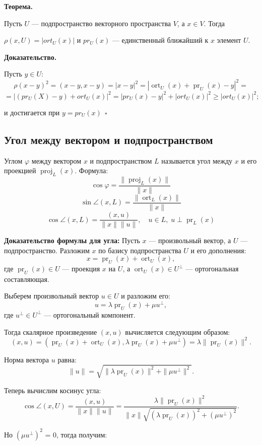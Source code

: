\documentclass[12pt]{article}
\begin{document}
\textbf{Теорема.}

Пусть \( U \) — подпространство векторного пространства \( V \), а \( x \in V \). Тогда

$\rho (x, U) = |ort_U(x)|$ и $pr_U(x)$ — единственный ближайший к $x$ элемент $U$.

\textbf{Доказательство.}

Пусть $y \in U$:
\[
\rho (x - y)^2 = (x - y, x-y) = |x-y|^2 = |\operatorname{ort}_U(x) + \operatorname{pr}_U(x) - y|^2 = 
\]
\[
= |(pr_U(X) - y) + ort_U(x)|^2 = |pr_U(x) - y|^2 + |ort_U(x)|^2 \geq |ort_U(x)|^2; 
\]

и достигается при $y = pr_U(x) \ \ \square$

\subsection{Угол между вектором и подпространством}
Углом $\varphi$ между вектором $x$ и подпространством $L$ называется угол между $x$ и его проекцией $\operatorname{proj}_L(x)$. Формула:
\[
\cos \varphi = \frac{\|\operatorname{proj}_L(x)\|}{\|x\|}
\]
\[
\sin \angle(x, L) = \frac{\|\operatorname{ort}_L(x)\|}{\|x\|}
\]
\[
\cos \angle(x, L) = \frac{(x, u)}{\|x\| \|u\|}, \quad u \in L, \; u \perp \operatorname{pr}_L(x)
\]

\textbf{Доказательство формулы для угла:}
Пусть $x$ — произвольный вектор, а $U$ — подпространство. Разложим $x$ по базису подпространства $U$ и его дополнения:
\[
x = \operatorname{pr}_U(x) + \operatorname{ort}_U(x),
\]
где $\operatorname{pr}_U(x) \in U$ — проекция $x$ на $U$, а $\operatorname{ort}_U(x) \in U^\perp$ — ортогональная составляющая.

Выберем произвольный вектор $u \in U$ и разложим его:
\[
u = \lambda \operatorname{pr}_U(x) + \mu u^\perp,
\]
где $u^\perp \in U^\perp$ — ортогональный компонент.

Тогда скалярное произведение $(x, u)$ вычисляется следующим образом:
\[
(x, u) = (\operatorname{pr}_U(x) + \operatorname{ort}_U(x), \lambda \operatorname{pr}_U(x) + \mu u^\perp) = \lambda \|\operatorname{pr}_U(x)\|^2.
\]

Норма вектора $u$ равна:
\[
\|u\| = \sqrt{\|\lambda \operatorname{pr}_U(x)\|^2 + \|\mu u^\perp\|^2}.
\]

Теперь вычислим косинус угла:
\[
\cos \angle(x, U) = \frac{(x, u)}{\|x\| \|u\|} = \frac{\lambda \|\operatorname{pr}_U(x)\|^2}{\|x\| \sqrt{(\lambda \operatorname{pr}_U(x))^2 + (\mu u^\perp)^2}}.
\]

Но $(\mu u^\perp)^2$ = 0, тогда получим:
\end{document}
